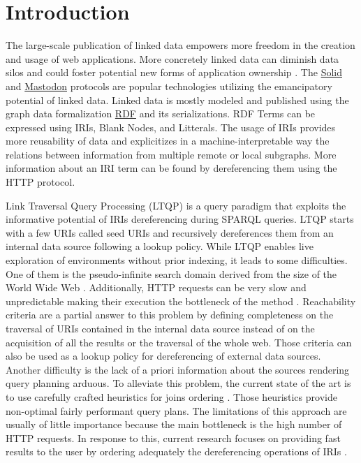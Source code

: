 
\section{Introduction}
 
The large-scale publication of linked data empowers more freedom in the creation and usage of web applications.
More concretely linked data can diminish data silos \cite{Verstraete2022}
and could foster potential new forms of application ownership \cite{Mechant2021}.
The \href{https://solidproject.org/TR/protocol}{Solid} and
\href{https://docs.joinmastodon.org/}{Mastodon} protocols
are popular technologies utilizing the emancipatory potential of linked data.
Linked data is mostly modeled and published using the graph data formalization \href{https://www.w3.org/TR/rdf12-concepts/}{RDF} and its serializations.
RDF Terms can be expressed using IRIs, Blank Nodes, and Litterals.
The usage of IRIs provides more reusability of data and explicitizes in a machine-interpretable way the relations between
information from multiple remote or local subgraphs.
More information about an IRI term can be found by dereferencing them using the HTTP protocol.

Link Traversal Query Processing (LTQP) \cite{Hartig2012} is a query paradigm that exploits
the informative potential of IRIs dereferencing during SPARQL queries.
LTQP starts with a few URIs called seed URIs and recursively dereferences them from an internal data source following a lookup policy.
While LTQP enables live exploration of environments without prior indexing, it leads to some difficulties.
One of them is the pseudo-infinite search domain derived from the size of the World Wide Web \cite{Hartig2014}.
Additionally, HTTP requests can be very slow and unpredictable making their execution the bottleneck of the method \cite{hartig2016walking}.
Reachability criteria \cite{Hartig2012} are a partial answer to this problem by defining completeness on the traversal of URIs
contained in the internal data source instead of on the acquisition of all the results or the traversal of the whole web.
Those criteria can also be used as a lookup policy for dereferencing of external data sources.
Another difficulty is the lack of a priori information about the sources rendering query planning arduous.
To alleviate this problem, the current state of the art is to use carefully crafted heuristics for joins ordering \cite{Hartig2011}.
Those heuristics provide non-optimal fairly performant query plans.
The limitations of this approach are usually of little importance because the main bottleneck is the high number of HTTP requests.
In response to this, current research focuses on providing fast results to the user by ordering adequately the dereferencing operations of IRIs \cite{hartig2016walking}.

